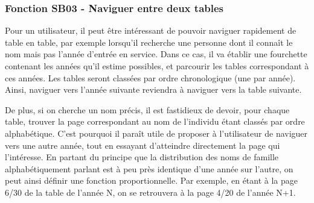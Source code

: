 \documentclass[a4paper]{article}
\begin{document}
\subsubsection{Fonction SB03 - Naviguer entre deux tables}

Pour un utilisateur, il peut être intéressant de pouvoir naviguer rapidement de table en table, par exemple lorsqu'il recherche une personne dont il connaît le nom mais pas l'année d'entrée en service. Dans ce cas, il va établir une fourchette contenant les années qu'il estime possibles, et parcourir les tables correspondant à ces années. Les tables seront classées par ordre chronologique (une par année). Ainsi, naviguer vers l'année suivante reviendra à naviguer vers la table suivante.

De plus, si on cherche un nom précis, il est fastidieux de devoir, pour chaque table, trouver la page correspondant au nom de l'individu étant classés par ordre alphabétique. C'est pourquoi il paraît utile de proposer à l'utilisateur de naviguer vers une autre année, tout en essayant d'atteindre directement la page qui l'intéresse. En partant du principe que la distribution des noms de famille alphabétiquement parlant est à peu près identique d'une année sur l'autre, on peut ainsi définir une fonction proportionnelle. Par exemple, en étant à la page 6/30 de la table de l'année N, on se retrouvera à la page 4/20 de l'année N+1.
\end{document}
